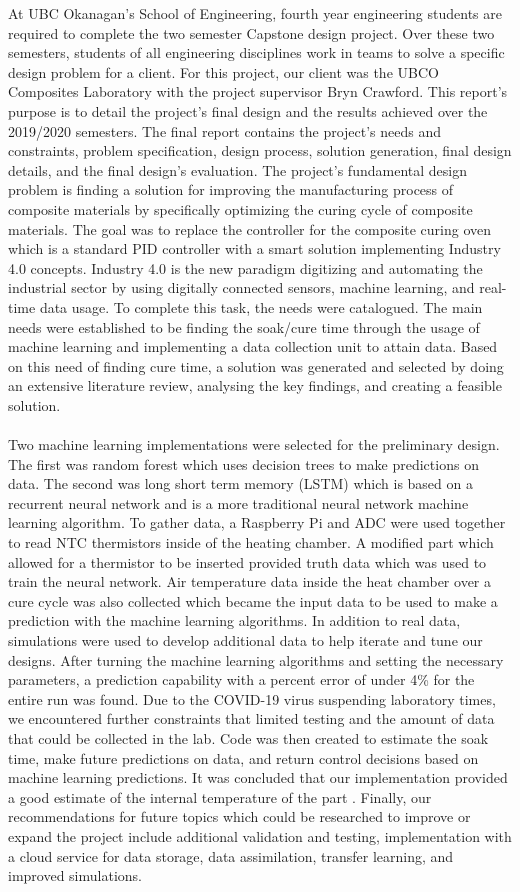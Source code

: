 At UBC Okanagan’s School of Engineering, fourth year engineering students are required to complete the two semester Capstone design project. Over these two semesters, students of all engineering disciplines work in teams to solve a specific design problem for a client. For this  project, our client was the UBCO Composites Laboratory with the project supervisor Bryn Crawford. This report’s purpose is to detail the project’s final design and the results achieved over the 2019/2020 semesters.  The final report contains the project's needs and constraints, problem specification, design process, solution generation, final design details, and the final design’s evaluation. The project’s fundamental design problem is finding a solution for improving the manufacturing process of composite materials by specifically optimizing the curing cycle of composite materials. The goal was to replace the controller for the composite curing oven which is a standard PID controller with a smart solution implementing Industry 4.0 concepts. Industry 4.0 is the new paradigm digitizing and automating the industrial sector by using digitally connected sensors, machine learning, and real-time data usage. To complete this task, the needs were catalogued. The main needs were established to be finding the soak/cure time through the usage of machine learning and implementing a data collection unit to attain data. Based on this need of finding cure time, a solution was generated and selected by doing an extensive literature review, analysing the key findings, and creating a feasible solution. \\\\
Two machine learning implementations were selected for the preliminary design. The first was random forest which uses decision trees to make predictions on data. The second was long short term memory (LSTM) which is based on a recurrent neural network and is a more traditional neural network machine learning algorithm. To gather data, a Raspberry Pi and ADC were used together to read NTC thermistors inside of the heating chamber. A modified part which allowed for a thermistor to be inserted provided truth data which was used to train the neural network. Air temperature data inside the heat chamber over a cure cycle was also collected which became the input data to be used to make a prediction with the machine learning algorithms. In addition to real data, simulations were used to develop additional data to help iterate and tune our designs. After turning the machine learning algorithms and setting the necessary parameters, a prediction capability with a percent error of under 4\% for the entire run was found. Due to the COVID-19 virus suspending laboratory times, we encountered further constraints that limited testing and the amount of data that could be collected in the lab. Code was then created to estimate the soak time, make future predictions on data, and return control decisions based on machine learning predictions. It was concluded that our implementation provided a good estimate  of the internal temperature of the part . Finally, our recommendations for future topics which could be researched to improve or expand the project include additional validation and testing, implementation with a cloud service for data storage, data assimilation, transfer learning, and improved simulations. 
